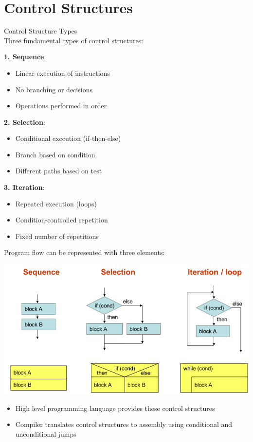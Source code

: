 \section{Control Structures}



\begin{concept}{Control Structure Types}\\
Three fundamental types of control structures:

\textbf{1. Sequence}:
\begin{itemize}
  \item Linear execution of instructions
  \item No branching or decisions
  \item Operations performed in order
\end{itemize}

\textbf{2. Selection}:
\begin{itemize}
  \item Conditional execution (if-then-else)
  \item Branch based on condition
  \item Different paths based on test
\end{itemize}

\textbf{3. Iteration}:
\begin{itemize}
  \item Repeated execution (loops)
  \item Condition-controlled repetition
  \item Fixed number of repetitions
\end{itemize}

Program flow can be represented with three elements:

\includegraphics[width=\linewidth]{images/tyoesofcontrolstructures.png}

\begin{itemize}
    \item High level programming language provides these control structures
    \item Compiler translates control structures to assembly using conditional
    and unconditional jumps
\end{itemize}
\end{concept}

